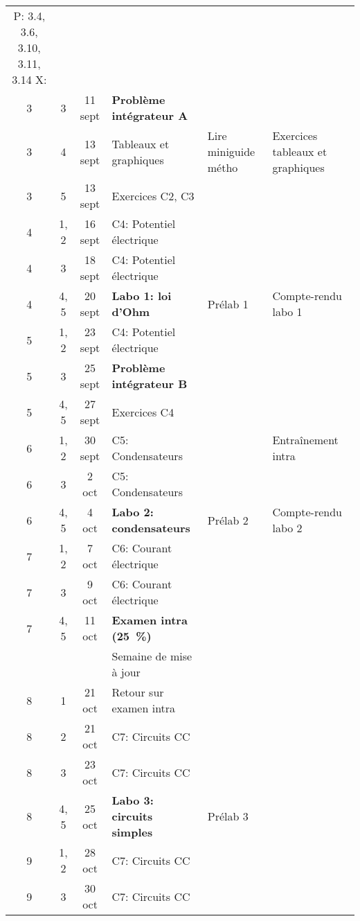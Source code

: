 \documentclass[10pt]{article}
\begin{document}
\begin{longtable}{cccp{6cm}lp{9cm}}
       P: 3.4, 3.6, 3.10, 3.11, 3.14 \newline
       X:  \\
  3     &  3     &  11 sept  &  \textbf{Problème intégrateur A}  \\
  3     &  4     &  13 sept   &  Tableaux et graphiques
    & Lire miniguide métho
    & Exercices tableaux et graphiques  \\
  3     &  5     &  13 sept   &  Exercices C2, C3  \\
  \midrule
  4     &  1, 2  &  16 sept   &  C4: Potentiel électrique  \\
  4     &  3     &  18 sept   &  C4: Potentiel électrique  \\
  4     &  4, 5  &  20 sept   &  \textbf{Labo 1: loi d'Ohm}
    &  Prélab 1  &  Compte-rendu labo 1 \\
  \midrule
  5     &  1, 2  &  23 sept  &  C4: Potentiel électrique  \\
  5     &  3     &  25 sept  &  \textbf{Problème intégrateur B}  \\
  5     &  4, 5  &  27 sept  &  Exercices C4
    &    &   \\
  \midrule
  6     &  1, 2  &  30 sept  &  C5: Condensateurs
    &  &  Entraînement intra  \\
  6     &  3     &  2 oct    &  C5: Condensateurs  \\
  6     &  4, 5  &  4 oct    &  \textbf{Labo 2: condensateurs}
    &  Prélab 2  &  Compte-rendu labo 2 \\
  \midrule
  7     &  1, 2  &  7 oct    &  C6: Courant électrique  \\
  7     &  3     &  9 oct    &  C6: Courant électrique  \\
  7     &  4, 5  &  11 oct   &  \textbf{Examen intra (\qty{25}{\percent})}
    &    &   \\
  \midrule
        &        &           &  Semaine de mise à jour  \\
  \midrule
  8     &  1     &  21 oct   &  Retour sur examen intra  \\
  8     &  2     &  21 oct   &  C7: Circuits CC  \\
  8     &  3     &  23 oct   &  C7: Circuits CC  &   &   \\
  8     &  4, 5  &  25 oct   &  \textbf{Labo 3: circuits simples}
    &  Prélab 3  &   \\
  \midrule
  9     &  1, 2  &  28 oct   &  C7: Circuits CC  \\
  9     &  3     &  30 oct   &  C7: Circuits CC  \\

\end{longtable}
\end{document}
